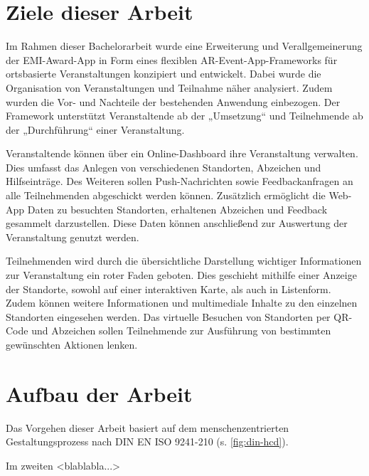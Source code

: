 \section{Ziele dieser Arbeit} \label{sec:goals}

Im Rahmen dieser Bachelorarbeit wurde eine Erweiterung und Verallgemeinerung der
EMI-Award-App in Form eines flexiblen AR-Event-App-Frameworks für ortsbasierte
Veranstaltungen konzipiert und entwickelt. Dabei wurde die Organisation von
Veranstaltungen und Teilnahme näher analysiert. Zudem wurden die Vor- und
Nachteile der bestehenden Anwendung einbezogen. Der Framework unterstützt
Veranstaltende ab der „Umsetzung“ und Teilnehmende ab der „Durchführung“ einer Veranstaltung.

Veranstaltende können über ein Online-Dashboard ihre Veranstaltung verwalten.
Dies umfasst das Anlegen von verschiedenen Standorten, Abzeichen und
Hilfseinträge. Des Weiteren sollen Push-Nachrichten sowie Feedbackanfragen an
alle Teilnehmenden abgeschickt werden können. Zusätzlich ermöglicht die Web-App
Daten zu besuchten Standorten, erhaltenen Abzeichen und Feedback gesammelt
darzustellen. Diese Daten können anschließend zur Auswertung der Veranstaltung
genutzt werden.

Teilnehmenden wird durch die übersichtliche Darstellung wichtiger Informationen
zur Veranstaltung ein roter Faden geboten. Dies geschieht mithilfe einer
Anzeige der Standorte, sowohl auf einer interaktiven Karte, als auch in
Listenform. Zudem können weitere Informationen und multimediale Inhalte zu den
einzelnen Standorten eingesehen werden. Das virtuelle Besuchen von Standorten
per QR-Code und Abzeichen sollen Teilnehmende zur Ausführung von bestimmten
gewünschten Aktionen lenken.

\section{Aufbau der Arbeit}


Das Vorgehen dieser Arbeit basiert auf dem menschenzentrierten Gestaltungsprozess nach DIN
EN ISO 9241-210 (s. \autoref{fig:din-hcd}).

Im zweiten <blablabla...>

